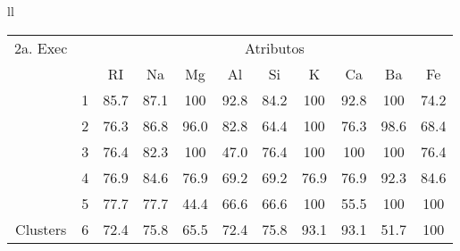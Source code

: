 \begin{table}[!ht]
\begin{tabular}{ll}
   
   \small\addtolength{\tabcolsep}{-5pt}
    \begin{tabular}{|cl|c|c|c|c|c|c|c|c|c|}
        \hline \hline
            {\tiny 2a. Exec}     &   & \multicolumn{9}{c|}{\tiny Atributos}                                               \\ \cline{3-11} 
       \multicolumn{1}{|l}{}                            &   & RI    & Na    & Mg  & Al   & Si   & K   & Ca   & Ba  & Fe             \\ \hline
        \multicolumn{1}{|c|}{}                           & 1 & 85.7 & 87.1  & 100 & 92.8 & 84.2 & 100 & 92.8 & 100 & 74.2 \\ \cline{2-11} 
        \multicolumn{1}{|c|}{}                           & 2 & 76.3 & 86.8  & 96.0 & 82.8 & 64.4 & 100  & 76.3 &98.6 & 68.4  \\ \cline{2-11} 
        \multicolumn{1}{|c|}{}                           & 3 & 76.4   & 82.3& 100  & 47.0 & 76.4 & 100  & 100 & 100 & 76.4  \\ \cline{2-11}
        \multicolumn{1}{|c|}{}                           & 4 & 76.9   & 84.6& 76.9  & 69.2 & 69.2 & 76.9  & 76.9 & 92.3 & 84.6  \\ \cline{2-11}
        \multicolumn{1}{|c|}{}                           & 5 & 77.7   & 77.7& 44.4  & 66.6 & 66.6 & 100  & 55.5 & 100 & 100  \\ \cline{2-11}
        \multicolumn{1}{|c|}{\multirow{-3}{*}{\tiny Clusters}} & 6 & 72.4 & 75.8& 65.5  & 72.4 & 75.8 & 93.1  & 93.1 & 51.7 & 100  \\ 
        
        \hline
      \end{tabular}
  \\  [15ex]
 

\end{tabular}
\end{table}
